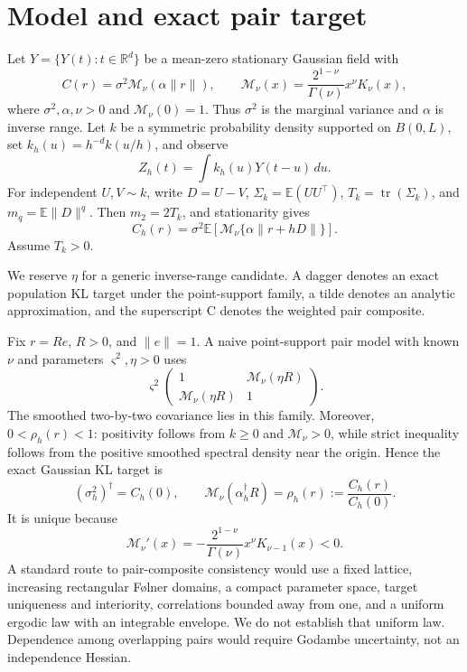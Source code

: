 \documentclass[sigconf]{acmart}
\theoremstyle{remark}
\newcommand{\Matern}{\mathcal M}
\newcommand{\E}{\mathbb E}
\newcommand{\R}{\mathbb R}
\newcommand{\tr}{\operatorname{tr}}
\begin{document}
\section{Model and exact pair target}

Let \(Y=\{Y(t):t\in\R^d\}\) be a mean-zero stationary Gaussian field with
\begin{equation}
  C(r)=\sigma^2\Matern_\nu(\alpha\lVert r\rVert),\qquad
  \Matern_\nu(x)=\frac{2^{1-\nu}}{\Gamma(\nu)}x^\nu K_\nu(x),
  \label{eq:cov}
\end{equation}
where \(\sigma^2,\alpha,\nu>0\) and \(\Matern_\nu(0)=1\). Thus \(\sigma^2\)
is the marginal variance and \(\alpha\) is inverse range. Let \(k\) be a
symmetric probability density supported on
\(B(0,L)\), set \(k_h(u)=h^{-d}k(u/h)\), and observe
\begin{equation}
  Z_h(t)=\int k_h(u)Y(t-u)\,du.
\end{equation}
For independent \(U,V\sim k\), write \(D=U-V\),
\(\Sigma_k=\E(UU^\top)\), \(T_k=\tr(\Sigma_k)\), and
\(m_q=\E\lVert D\rVert^q\). Then \(m_2=2T_k\), and stationarity gives
\begin{equation}
  C_h(r)=\sigma^2\E\!\left[\Matern_\nu\{\alpha\lVert r+hD\rVert\}\right].
  \label{eq:smoothcov}
\end{equation}
Assume \(T_k>0\).

We reserve \(\eta\) for a generic inverse-range candidate. A dagger denotes an
exact population KL target under the point-support family, a tilde denotes an
analytic approximation, and the superscript \(\mathrm C\) denotes the
weighted pair composite.

Fix \(r=Re\), \(R>0\), and \(\lVert e\rVert=1\). A naive point-support pair
model with known \(\nu\) and parameters \(\varsigma^2,\eta>0\) uses
\begin{equation}
  \varsigma^2
  \begin{pmatrix}
  1 & \Matern_\nu(\eta R)\\
  \Matern_\nu(\eta R)&1
  \end{pmatrix}.
\end{equation}
The smoothed two-by-two covariance lies in this family. Moreover,
\(0<\rho_h(r)<1\): positivity follows from \(k\geq0\) and
\(\Matern_\nu>0\), while strict inequality follows from the positive smoothed
spectral density near the origin. Hence the exact Gaussian KL target is
\begin{equation}
  (\sigma_h^2)^\dagger=C_h(0),\qquad
  \Matern_\nu(\alpha_h^\dagger R)=\rho_h(r)
  :=\frac{C_h(r)}{C_h(0)}.
  \label{eq:target}
\end{equation}
It is unique because
\begin{equation}
  \Matern_\nu'(x)
  =-\frac{2^{1-\nu}}{\Gamma(\nu)}x^\nu K_{\nu-1}(x)<0.
  \label{eq:deriv}
\end{equation}
A standard route to pair-composite consistency would use a fixed lattice,
increasing rectangular F{\o}lner domains, a compact parameter space, target
uniqueness and interiority, correlations bounded away from one, and a uniform
ergodic law with an integrable envelope. We do not establish that uniform law.
Dependence among overlapping pairs would require Godambe uncertainty, not an
independence Hessian.
\end{document}
